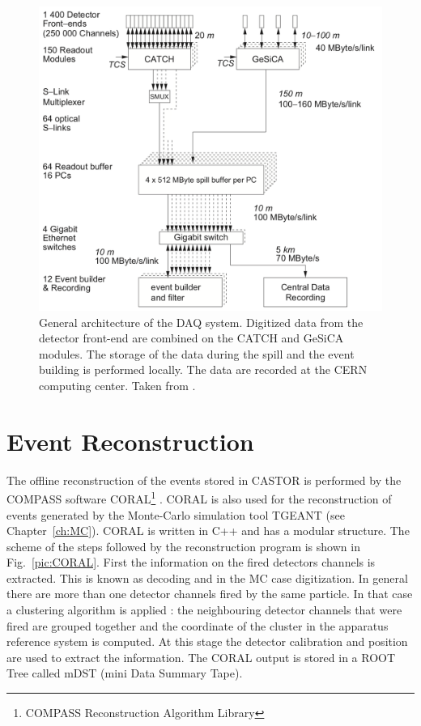 \begin{figure}[!h]
  \centering
	\includegraphics[scale=0.4]{./gfx/DAQ.png}
	\caption{General architecture of the DAQ system. Digitized data from the detector front-end are combined on the CATCH and GeSiCA modules. The storage of the data during the spill and the event building is performed locally. The data are recorded at the CERN computing center. Taken from \cite{NIM}.}
	\label{pic:DAQ}
\end{figure}


\section{Event Reconstruction}

The offline reconstruction of the events stored in CASTOR is performed by the COMPASS software CORAL\footnote{COMPASS Reconstruction Algorithm Library} \cite{NIM}. CORAL is also used for the reconstruction of events generated by the Monte-Carlo simulation tool TGEANT (see Chapter~\ref{ch:MC}). CORAL is written in C++ and has a modular structure. The scheme of the steps followed by the reconstruction program is shown in Fig.~\ref{pic:CORAL}. First the information on the fired detectors channels is extracted. This is known as decoding and in the MC case digitization. In general there are more than one detector channels fired by the same particle. In that case a clustering algorithm is applied : the neighbouring detector channels that were fired are grouped together and the coordinate of the cluster in the apparatus reference system is computed. At this stage the detector calibration and position are used to extract the information. The CORAL output is stored in a ROOT Tree called mDST (mini Data Summary Tape).

